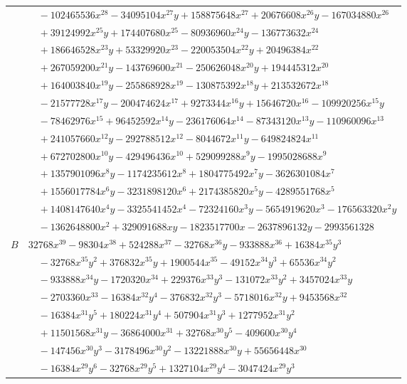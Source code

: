 \documentclass[11pt]{article}
\begin{document}
\begin{longtable}{@{}ll@{}}
 & $\quad -102465536x^{28}-34095104x^{27}y+158875648x^{27}+20676608x^{26}y-167034880x^{26}$\\
 & $\quad +39124992x^{25}y+174407680x^{25}-80936960x^{24}y-136773632x^{24}$\\
 & $\quad +186646528x^{23}y+53329920x^{23}-220053504x^{22}y+20496384x^{22}$\\
 & $\quad +267059200x^{21}y-143769600x^{21}-250626048x^{20}y+194445312x^{20}$\\
 & $\quad +164003840x^{19}y-255868928x^{19}-130875392x^{18}y+213532672x^{18}$\\
 & $\quad -21577728x^{17}y-200474624x^{17}+9273344x^{16}y+15646720x^{16}-109920256x^{15}y$\\
 & $\quad -78462976x^{15}+96452592x^{14}y-236176064x^{14}-87343120x^{13}y-110960096x^{13}$\\
 & $\quad +241057660x^{12}y-292788512x^{12}-8044672x^{11}y-649824824x^{11}$\\
 & $\quad +672702800x^{10}y-429496436x^{10}+529099288x^{9}y-1995028688x^{9}$\\
 & $\quad +1357901096x^{8}y-1174235612x^{8}+1804775492x^{7}y-3626301084x^{7}$\\
 & $\quad +1556017784x^{6}y-3231898120x^{6}+2174385820x^{5}y-4289551768x^{5}$\\
 & $\quad +1408147640x^{4}y-3325541452x^{4}-72324160x^{3}y-5654919620x^{3}-176563320x^{2}y$\\
 & $\quad -1362648800x^{2}+329091688xy-1823517700x-2637896132y-2993561328$\\
$B$ & $32768x^{39}-98304x^{38}+524288x^{37}-32768x^{36}y-933888x^{36}+16384x^{35}y^{3}$\\
 & $\quad -32768x^{35}y^{2}+376832x^{35}y+1900544x^{35}-49152x^{34}y^{3}+65536x^{34}y^{2}$\\
 & $\quad -933888x^{34}y-1720320x^{34}+229376x^{33}y^{3}-131072x^{33}y^{2}+3457024x^{33}y$\\
 & $\quad -2703360x^{33}-16384x^{32}y^{4}-376832x^{32}y^{3}-5718016x^{32}y+9453568x^{32}$\\
 & $\quad -16384x^{31}y^{5}+180224x^{31}y^{4}+507904x^{31}y^{3}+1277952x^{31}y^{2}$\\
 & $\quad +11501568x^{31}y-36864000x^{31}+32768x^{30}y^{5}-409600x^{30}y^{4}$\\
 & $\quad -147456x^{30}y^{3}-3178496x^{30}y^{2}-13221888x^{30}y+55656448x^{30}$\\
 & $\quad -16384x^{29}y^{6}-32768x^{29}y^{5}+1327104x^{29}y^{4}-3047424x^{29}y^{3}$\\

\end{longtable}
\end{document}
